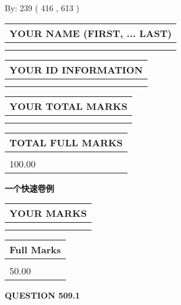 \documentclass{ctexart}
\begin{document}
   
\hspace{1.0in} By: 
 239 ( 416 ,  613 )
   
   
   
   
\newpage 
\setcounter{page}{ 
   509001 } 
   
   
   
   
\noindent\begin{tabular}{|l|}
\hline
YOUR NAME (FIRST, ... LAST)  \\
\hline
 \\ 
 \\ 
\hline
\end{tabular}
\hspace{0.05in} \begin{tabular}{|l|}
\hline
 YOUR   ID   INFORMATION  \\
\hline
 \\ 
 \\ 
\hline
\end{tabular}
   
   
\vspace{0.2in}\noindent\begin{tabular}{|l|}
\hline
YOUR TOTAL MARKS  \\
\hline
 \\ 
 \\ 
\hline
\end{tabular}
\hspace{0.05in} \begin{tabular}{|l|}
\hline
TOTAL FULL MARKS  \\
\hline
 \\ 
100.00 \\
\hline
\end{tabular}
   
   
 \vspace{0.2in}
{\LARGE {\textbf{ 一个快速卷例}}}
   
   
  
\vspace{0.2in}
  
\noindent\begin{tabular}{|l|}
\hline
 YOUR MARKS  \\
\hline
 \\ 
 \\ 
\hline
\end{tabular}
\hspace{0.05in} \begin{tabular}{|l|}
\hline
 Full Marks  \\
\hline
 \\ 
50.00 \\
\hline
\end{tabular}
{\textbf{\Large{QUESTION
509.1 
}}}
  
\end{document}
